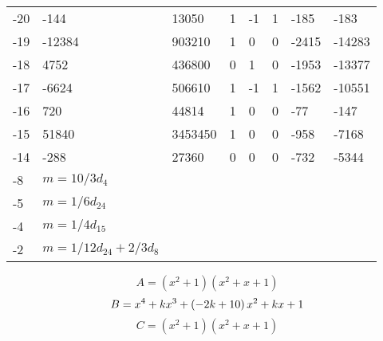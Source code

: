 \documentclass{amsart}
\begin{document}
\begin{longtable}{|l|l|l|lllll|}
-20&-144&13050&1&-1&1&-185&-183\\
-19&-12384&903210&1&0&0&-2415&-14283\\
-18&4752&436800&0&1&0&-1953&-13377\\
-17&-6624&506610&1&-1&1&-1562&-10551\\
-16&720&44814&1&0&0&-77&-147\\
-15&51840&3453450&1&0&0&-958&-7168\\
-14&-288&27360&0&0&0&-732&-5344\\
-8&$m=10/3d_{4}$&&\multicolumn{5}{c|}{}\\
-5&$m=1/6d_{24}$&&\multicolumn{5}{c|}{}\\
-4&$m=1/4d_{15}$&&\multicolumn{5}{c|}{}\\
-2&$m=1/12d_{24}+2/3d_{8}$&&\multicolumn{5}{c|}{}\\
\hline
\end{longtable}
$$A=(x^2
 + 1)(x^2
 + x
 + 1)$$
$$B=x^4
 + k\*x^3
 + \left(-2\*k
 + 10\right) \*x^2
 + k\*x
 + 1$$
$$C=(x^2
 + 1)(x^2
 + x
 + 1)$$
\end{document}
